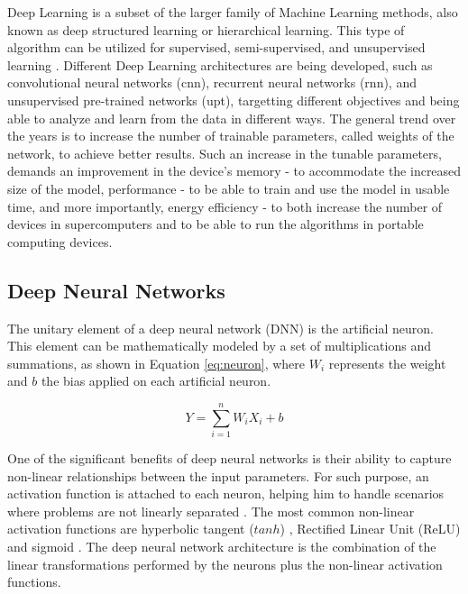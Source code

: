 Deep Learning is a subset of the larger family of Machine Learning methods, also known as deep structured learning or hierarchical learning. This type of algorithm can be utilized for supervised, semi-supervised, and unsupervised learning \cite{bengio_representation_2013, schmidhuber_deep_2015}. Different Deep Learning architectures are being developed, such as convolutional neural networks (\acrshort{cnn}), recurrent neural networks (\acrshort{rnn}), and unsupervised pre-trained networks (\acrshort{upt}), targetting different objectives and being able to analyze and learn from the data in different ways. The general trend over the years is to increase the number of trainable parameters, called weights of the network, to achieve better results. Such an increase in the tunable parameters, demands an improvement in the device's memory - to accommodate the increased size of the model, performance - to be able to train and use the model in usable time, and more importantly, energy efficiency - to both increase the number of devices in supercomputers and to be able to run the algorithms in portable computing devices.

\subsection{Deep Neural Networks}

The unitary element of a deep neural network (DNN) is the artificial neuron. This element can be mathematically modeled by a set of multiplications and summations, as shown in Equation \ref{eq:neuron}, where $W_i$ represents the weight and $b$ the bias applied on each artificial neuron.

\begin{equation}
\label{eq:neuron}
    Y = \sum_{i=1}^{n} W_iX_i+b
\end{equation}

One of the significant benefits of deep neural networks is their ability to capture non-linear relationships between the input parameters. For such purpose, an activation function is attached to each neuron, helping him to handle scenarios where problems are not linearly separated \cite{dong_dnnmark:_2017}. The most common non-linear activation functions are hyperbolic tangent ($tanh$) \cite{orr_neural_1998}, Rectified Linear Unit (ReLU) \cite{orr_neural_1998} and sigmoid \cite{orr_neural_1998}. The deep neural network architecture is the combination of the linear transformations performed by the neurons plus the non-linear activation functions.

